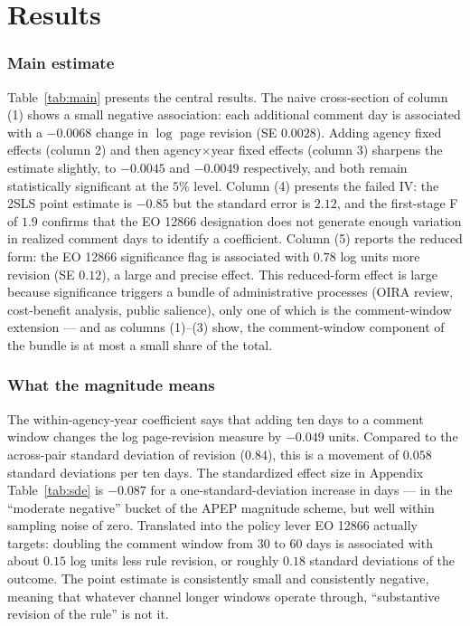\documentclass[12pt]{article}
\begin{document}
\section{Results}



\subsubsection*{Main estimate} Table~\ref{tab:main} presents the central results. The naive cross-section of column (1) shows a small negative association: each additional comment day is associated with a $-0.0068$ change in $\log$ page revision (SE $0.0028$). Adding agency fixed effects (column 2) and then agency$\times$year fixed effects (column 3) sharpens the estimate slightly, to $-0.0045$ and $-0.0049$ respectively, and both remain statistically significant at the $5\%$ level. Column (4) presents the failed IV: the 2SLS point estimate is $-0.85$ but the standard error is $2.12$, and the first-stage F of $1.9$ confirms that the EO 12866 designation does not generate enough variation in realized comment days to identify a coefficient. Column (5) reports the reduced form: the EO 12866 significance flag is associated with $0.78$ log units more revision (SE $0.12$), a large and precise effect. This reduced-form effect is large because significance triggers a bundle of administrative processes (OIRA review, cost-benefit analysis, public salience), only one of which is the comment-window extension --- and as columns (1)--(3) show, the comment-window component of the bundle is at most a small share of the total.

\subsubsection*{What the magnitude means} The within-agency-year coefficient says that adding ten days to a comment window changes the log page-revision measure by $-0.049$ units. Compared to the across-pair standard deviation of revision ($0.84$), this is a movement of $0.058$ standard deviations per ten days. The standardized effect size in Appendix Table~\ref{tab:sde} is $-0.087$ for a one-standard-deviation increase in days --- in the ``moderate negative'' bucket of the APEP magnitude scheme, but well within sampling noise of zero. Translated into the policy lever EO 12866 actually targets: doubling the comment window from 30 to 60 days is associated with about $0.15$ log units less rule revision, or roughly $0.18$ standard deviations of the outcome. The point estimate is consistently small and consistently negative, meaning that whatever channel longer windows operate through, ``substantive revision of the rule'' is not it.
\end{document}
